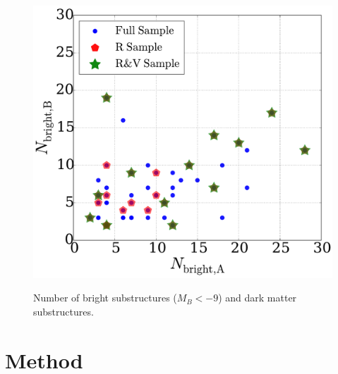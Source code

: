 \documentclass{emulateapj}
\begin{document}
\begin{figure}
\centering
\includegraphics[width=\hsize]{n_structure.pdf}\\
\caption{Number of bright substructures ($M_{B}<-9$) and dark matter
  substructures.}
\label{fig:nstructure}
\end{figure}



\section{Method}
\label{Method}
\end{document}
